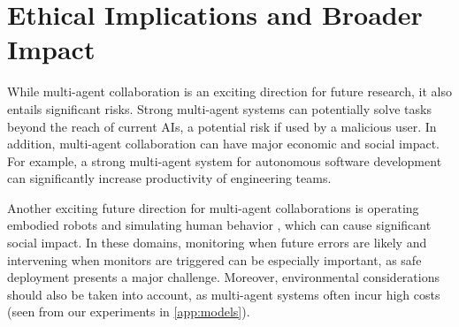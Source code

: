 \section*{Ethical Implications and Broader Impact}
While multi-agent collaboration is an exciting direction for future research, it also entails significant risks.
Strong multi-agent systems can potentially solve tasks beyond the reach of current AIs, a potential risk if used by a malicious user.
In addition, multi-agent collaboration can have major economic and social impact. For example, a strong multi-agent system for autonomous software development can significantly increase productivity of engineering teams.

Another exciting future direction for multi-agent collaborations is operating embodied robots \cite{mandi2023rocodialecticmultirobotcollaboration, chen2024scalablemultirobotcollaborationlarge} and simulating human behavior \cite{10.1145/3586183.3606763}, which can cause significant social impact. In these domains, monitoring when future errors are likely and intervening when monitors are triggered can be especially important, as safe deployment presents a major challenge.
Moreover, environmental considerations should also be taken into account, as multi-agent systems often incur high costs (seen from our experiments in \ref{app:models}).